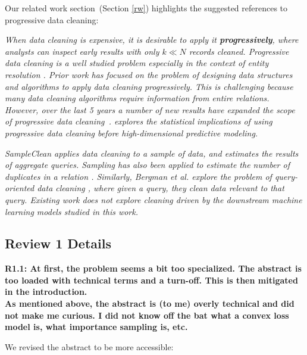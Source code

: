 \vspace{0.5em}
Our related work section~(Section \ref{rw}) highlights the suggested references to progressive data cleaning:

\emph{When data cleaning is expensive, it is desirable to apply it \textbf{progressively}, where analysts can inspect early results with only $k \ll N$ records cleaned.
Progressive data cleaning is a well studied problem especially in the context of entity resolution \cite{altowim2014progressive, whang2014incremental, papenbrock2015progressive, gruenheid2014incremental}.
Prior work has focused on the problem of designing data structures and algorithms to apply data cleaning progressively.
This is challenging because many data cleaning algorithms require information from entire relations.
However, over the last 5 years a number of new results have expanded the scope of progressive data cleaning~\cite{mayfield2010eracer, DBLP:journals/pvldb/YakoutENOI11, yakout2013don}.
\sys explores the statistical implications of using progressive data cleaning before high-dimensional predictive modeling.}

\vspace{0.5em}

\emph{SampleClean\cite{wang1999sample} applies data cleaning to a sample of data, and estimates the results of aggregate queries.
Sampling has also been applied to estimate the number of duplicates in a relation \cite{heise2014estimating}. 
Similarly, Bergman et al. explore the problem of query-oriented data cleaning \cite{DBLP:conf/sigmod/BergmanMNT15}, where given a query, they clean data relevant to that query. 
Existing work does not explore cleaning driven by the downstream machine learning models studied in this work.}

\subsection*{Review 1 Details} 

\noindent\textbf{R1.1: At first, the problem seems a bit too specialized. The abstract is too loaded with technical terms and a turn-off. This is then mitigated in the introduction. \\
As mentioned above, the abstract is (to me) overly technical and did not make me curious. I did not know off the bat what a convex loss model is, what importance sampling is, etc.}

\noindent We revised the abstract to be more accessible:

